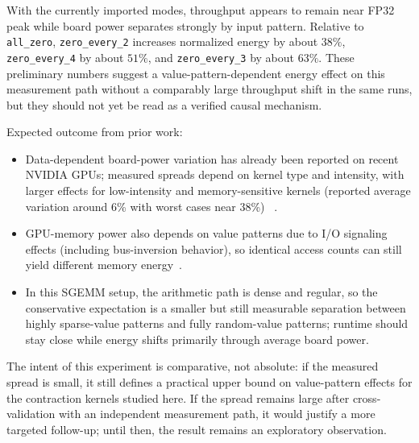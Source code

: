 With the currently imported modes, throughput appears to remain near FP32 peak
while board power separates strongly by input pattern. Relative to
\texttt{all\_zero}, \texttt{zero\_every\_2} increases normalized energy by
about $38\%$, \texttt{zero\_every\_4} by about $51\%$, and
\texttt{zero\_every\_3} by about $63\%$. These preliminary numbers suggest a
value-pattern-dependent energy effect on this measurement path without a
comparably large throughput shift in the same runs, but they should not yet be
read as a verified causal mechanism.

Expected outcome from prior work:
\begin{itemize}
  \item Data-dependent board-power variation has already been reported on recent
  NVIDIA GPUs; measured spreads depend on kernel type and intensity, with larger
  effects for low-intensity and memory-sensitive kernels (reported average
  variation around 6\% with worst cases near 38\%)
  ~\cite{hammouda2024input-dependent-gpu-power}.
  \item GPU-memory power also depends on value patterns due to I/O signaling
  effects (including bus-inversion behavior), so identical access counts can
  still yield different memory energy~\cite{song2019mempower}.
  \item In this SGEMM setup, the arithmetic path is dense and regular, so the
  conservative expectation is a smaller but still measurable separation between
  highly sparse-value patterns and fully random-value patterns; runtime should
  stay close while energy shifts primarily through average board power.
\end{itemize}

The intent of this experiment is comparative, not absolute: if the measured
spread is small, it still defines a practical upper bound on value-pattern
effects for the contraction kernels studied here. If the spread remains large
after cross-validation with an independent measurement path, it would justify a
more targeted follow-up; until then, the result remains an exploratory
observation.
